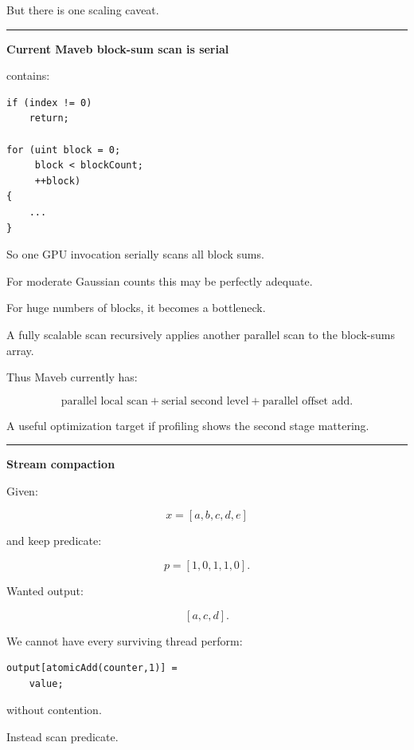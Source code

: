 But there is one scaling caveat.

\begin{center}\rule{0.5\linewidth}{0.5pt}\end{center}

\textbf{Current Maveb block-sum scan is serial}

 contains:

\protect{}\label{qa2bts}%
\begin{verbatim}
if (index != 0)
    return;

for (uint block = 0;
     block < blockCount;
     ++block)
{
    ...
}
\end{verbatim}

So one GPU invocation serially scans all block sums.

For moderate Gaussian counts this may be perfectly adequate.

For huge numbers of blocks, it becomes a bottleneck.

A fully scalable scan recursively applies another parallel scan to the block-sums array.

Thus Maveb currently has:

\[
\boxed{
\text{parallel local scan}
+
\text{serial second level}
+
\text{parallel offset add}.
}
\]

A useful optimization target if profiling shows the second stage mattering.

\begin{center}\rule{0.5\linewidth}{0.5pt}\end{center}

\textbf{Stream compaction}

Given:

\[
x=[a,b,c,d,e]
\]

and keep predicate:

\[
p=[1,0,1,1,0].
\]

Wanted output:

\[
[a,c,d].
\]

We cannot have every surviving thread perform:

\protect{}\label{ddkrn5}%
\begin{verbatim}
output[atomicAdd(counter,1)] =
    value;
\end{verbatim}

without contention.

Instead scan predicate.

